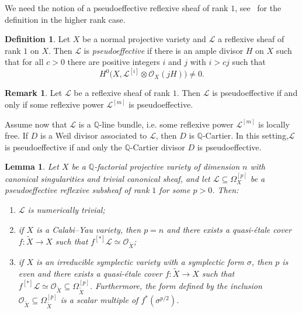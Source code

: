 \documentclass[11pt]{article}
\newtheorem{lemm}[theo]{Lemma}
\theoremstyle{definition}
\newtheorem{defi}[theo]{Definition}
\newtheorem{rema}[theo]{Remark}
\numberwithin{equation}{section}
\numberwithin{figure}{section}
\numberwithin{table}{section}
\newcommand{\Qbb}{\mathbb{Q}} %
\newcommand\sL{\mathcal{L}}
\newcommand{\OO}{\mathcal{O}}
\newcommand*{\romanenumi}{\renewcommand*{\theenumi}{\roman{enumi}}}
\begin{document}
We need the notion of a pseudoeffective reflexive sheaf of rank $1$, see~\cite[Definition~2.1]{HP17} for the definition in the higher rank case.


\begin{defi}\label{def:ps}
Let $X$ be a normal projective variety and $\sL$ a reflexive sheaf of rank $1$ on $X$. Then $\sL$ is \emph{pseudoeffective} if there is an ample divisor $H$ on $X$ such that for all $c > 0$ there are positive integers $i$ and $j$ with $i > cj$ such that
\[
H^0\big(X, \sL^{[i]} \otimes \OO_X(jH)\big) \neq 0.
\]
\end{defi}

\begin{rema}\label{rema:main2.5}
Let $\sL$ be a reflexive sheaf of rank $1$. Then $\sL$ is pseudoeffective if and only if some reflexive power $\sL^{[m]}$ is pseudoeffective.

Assume now that $\sL$ is a $\Qbb$-line bundle, i.e. some reflexive power $\sL^{[m]} $ is locally free. If $D$ is a Weil divisor associated to $\sL$, then $D$ is $\Qbb$-Cartier. In this setting,\linebreak$\sL$ is pseudoeffective if and only the $\Qbb$-Cartier divisor $D$ is pseudoeffective.
\end{rema}

\begin{lemm}\label{lem1}
Let $X$ be a $\Qbb$-factorial projective variety of dimension $n$ with canonical singularities and trivial canonical sheaf, and let $\sL \subseteq \Omega^{[p]}_X$ be a pseudoeffective reflexive subsheaf of rank $1$ for some $p > 0$. Then:
\begin{enumerate}\romanenumi
\item \label{list-2.6.1}$\sL$ is numerically trivial;
\item \label{list-2.6.2}if $X$ is a Calabi--Yau variety, then $p = n$ and there exists a quasi-étale cover $f\colon \widetilde X \to X$ such that $f^{[*]}\sL \simeq \OO_{\widetilde X}$;
\item \label{list-2.6.3}if $X$ is an irreducible symplectic variety with a symplectic form $\sigma$, then $p$ is even and there exists a quasi-étale cover $f\colon \widetilde X \to X$ such that $f^{[*]}\sL \simeq \OO_{\widetilde X}\subseteq \Omega^{[p]}_{\widetilde X}$. Furthermore, the form defined by the inclusion $\OO_{\widetilde X} \subseteq \Omega^{[p]}_{\widetilde X}$ is a scalar multiple of $f^*(\sigma^{p/2})$.
\end{enumerate}
\end{lemm}
\end{document}

